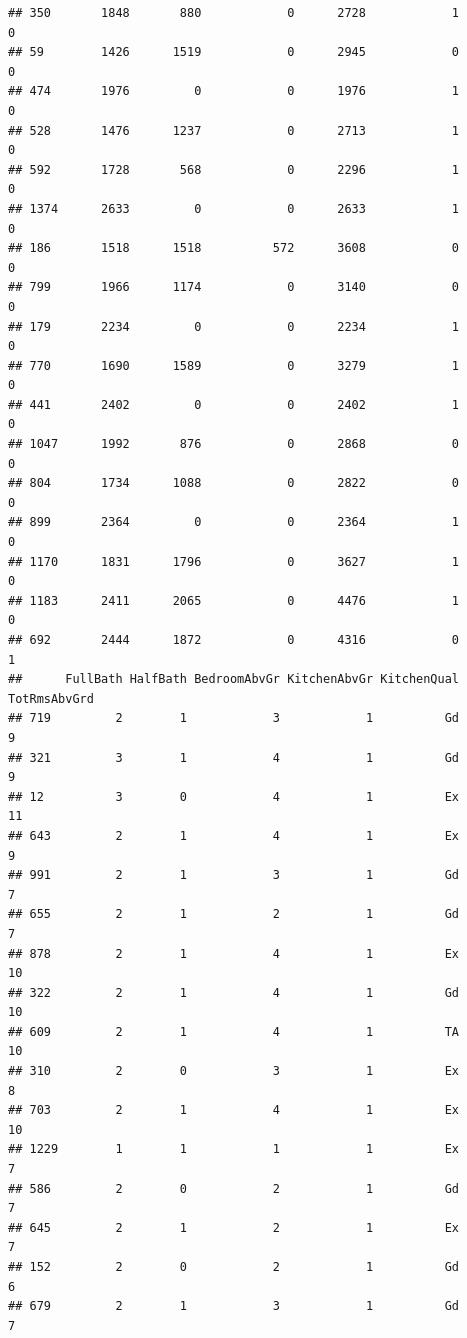 \documentclass[]{article}
\begin{document}
\begin{verbatim}
## 350       1848       880            0      2728            1            0
## 59        1426      1519            0      2945            0            0
## 474       1976         0            0      1976            1            0
## 528       1476      1237            0      2713            1            0
## 592       1728       568            0      2296            1            0
## 1374      2633         0            0      2633            1            0
## 186       1518      1518          572      3608            0            0
## 799       1966      1174            0      3140            0            0
## 179       2234         0            0      2234            1            0
## 770       1690      1589            0      3279            1            0
## 441       2402         0            0      2402            1            0
## 1047      1992       876            0      2868            0            0
## 804       1734      1088            0      2822            0            0
## 899       2364         0            0      2364            1            0
## 1170      1831      1796            0      3627            1            0
## 1183      2411      2065            0      4476            1            0
## 692       2444      1872            0      4316            0            1
##      FullBath HalfBath BedroomAbvGr KitchenAbvGr KitchenQual TotRmsAbvGrd
## 719         2        1            3            1          Gd            9
## 321         3        1            4            1          Gd            9
## 12          3        0            4            1          Ex           11
## 643         2        1            4            1          Ex            9
## 991         2        1            3            1          Gd            7
## 655         2        1            2            1          Gd            7
## 878         2        1            4            1          Ex           10
## 322         2        1            4            1          Gd           10
## 609         2        1            4            1          TA           10
## 310         2        0            3            1          Ex            8
## 703         2        1            4            1          Ex           10
## 1229        1        1            1            1          Ex            7
## 586         2        0            2            1          Gd            7
## 645         2        1            2            1          Ex            7
## 152         2        0            2            1          Gd            6
## 679         2        1            3            1          Gd            7

\end{verbatim}
\end{document}
